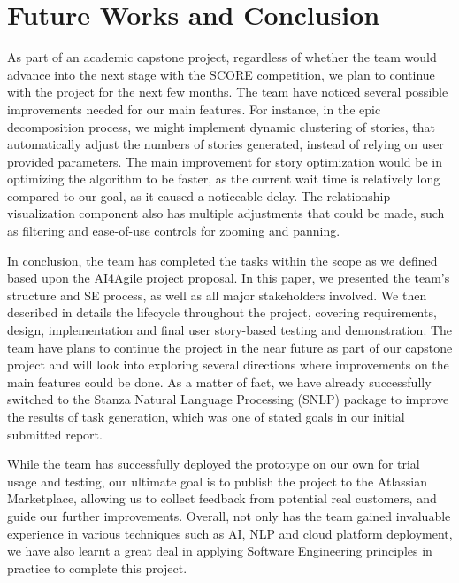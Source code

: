 \section{Future Works and Conclusion}
\label{conclusion}
As part of an academic capstone project, regardless of whether the team would advance into the next stage with the SCORE competition, we plan to continue with the project for the next few months. The team have noticed several possible improvements needed for our main features. For instance, in the epic decomposition process, we might implement dynamic clustering of stories, that automatically adjust the numbers of stories generated, instead of relying on user provided parameters. The main improvement for story optimization would be in optimizing the algorithm to be faster, as the current wait time is relatively long compared to our goal, as it caused a noticeable delay. The relationship visualization component also has multiple adjustments that could be made, such as filtering and ease-of-use controls for zooming and panning. 

In conclusion, the team has completed the tasks within the scope as we defined based upon the AI4Agile project proposal. In this paper, we presented the team's structure and SE process, as well as all major stakeholders involved. We then described in details the lifecycle throughout the project, covering requirements, design, implementation and final user story-based testing and demonstration. The team have plans to continue the project in the near future as part of our capstone project and will look into exploring several directions where improvements on the main features could be done. As a matter of fact, we have already successfully switched to the Stanza Natural Language Processing (SNLP) \cite{NLP1, stanza} package to improve the results of task generation, which was one of stated goals in our initial submitted report. 

While the team has successfully deployed the prototype on our own for trial usage and testing, our ultimate goal is to publish the project to the Atlassian Marketplace, allowing us to collect feedback from potential real customers, and guide our further improvements.  Overall, not only has the team gained invaluable experience  in various techniques such as AI, NLP and cloud platform deployment, we have also learnt a great deal in applying Software Engineering principles in practice to complete this project. 
